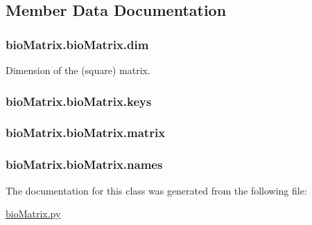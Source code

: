 \subsection{Member Data Documentation}
\hypertarget{classbio_matrix_1_1bio_matrix_a3f0a9cf4ebf8b5a5caddef88d3628d19}{
\subsubsection[{dim}]{\setlength{\rightskip}{0pt plus 5cm}bio\+Matrix.\+bio\+Matrix.\+dim}}\label{classbio_matrix_1_1bio_matrix_a3f0a9cf4ebf8b5a5caddef88d3628d19}


Dimension of the (square) matrix. 

\hypertarget{classbio_matrix_1_1bio_matrix_ac90ed5d6e7ed7779c2566203d2d4a90e}{
\subsubsection[{keys}]{\setlength{\rightskip}{0pt plus 5cm}bio\+Matrix.\+bio\+Matrix.\+keys}}\label{classbio_matrix_1_1bio_matrix_ac90ed5d6e7ed7779c2566203d2d4a90e}
\hypertarget{classbio_matrix_1_1bio_matrix_a8adb934516744a9ba7296921ef30eae6}{
\subsubsection[{matrix}]{\setlength{\rightskip}{0pt plus 5cm}bio\+Matrix.\+bio\+Matrix.\+matrix}}\label{classbio_matrix_1_1bio_matrix_a8adb934516744a9ba7296921ef30eae6}
\hypertarget{classbio_matrix_1_1bio_matrix_af9f4bf1730bd2901c587018c69c12e64}{
\subsubsection[{names}]{\setlength{\rightskip}{0pt plus 5cm}bio\+Matrix.\+bio\+Matrix.\+names}}\label{classbio_matrix_1_1bio_matrix_af9f4bf1730bd2901c587018c69c12e64}


The documentation for this class was generated from the following file\+:\begin{DoxyCompactItemize}
\item 
\hyperlink{bio_matrix_8py}{bio\+Matrix.\+py}\end{DoxyCompactItemize}
